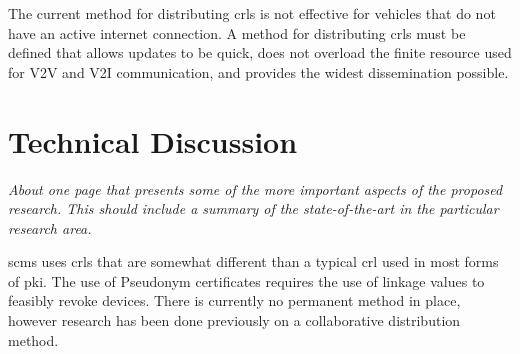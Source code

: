 \documentclass {article}
\newcommand{\sechint}[1]{\small{\emph{#1}} \bigskip}
\begin{document}
The current method for distributing \gls{crl}s is not effective for vehicles that do not have an active internet connection. A method for distributing \gls{crl}s must be defined that allows updates to be quick, does not overload the finite resource used for V2V and V2I communication, and provides the widest dissemination possible.

\section{Technical Discussion}{\sechint{About one page that presents some of the more important aspects of the proposed research. This should include a summary of the state-of-the-art in the particular research area.}}

\gls{scms} uses \gls{crl}s that are somewhat different than a typical \gls{crl} used in most forms of \gls{pki}. The use of Pseudonym certificates requires the use of linkage values to feasibly revoke devices. There is currently no permanent method in place, however research has been done previously on a collaborative distribution method.
\end{document}
